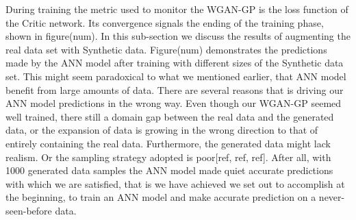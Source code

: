\documentclass[draft, a4, 10pt, onecolumn]{IEEEtran}
\begin{document}
During training the metric used to monitor the WGAN-GP is the loss function of the Critic network. Its convergence signals the ending of the training phase, shown in figure(num).
In this sub-section we discuss the results of augmenting the real data set with Synthetic data. Figure(num) demonstrates the predictions made by the ANN model after training with different sizes of the Synthetic data set.
This might seem paradoxical to what we mentioned earlier, that ANN model benefit from large amounts of data. There are several reasons that is driving our ANN model predictions in the wrong way. Even though our WGAN-GP seemed well trained, there still a domain gap between the real data and the generated data, or the expansion of data is growing in the wrong direction to that of entirely containing the real data. Furthermore, the generated data might lack realism. Or the sampling strategy adopted is poor[ref, ref, ref]. After all, with 1000 generated data samples the ANN model made quiet accurate predictions with which we are satisfied, that is we have achieved we set out to accomplish at the beginning, to train an ANN model and make accurate prediction on a never-seen-before data.
\end{document}
